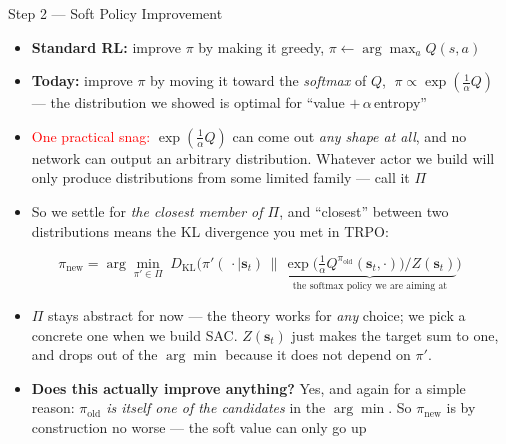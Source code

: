 \begin{frame}{Step 2 --- Soft Policy Improvement}
\small
\begin{itemize}
    \item \textbf{Standard RL:} improve $\pi$ by making it greedy, $\pi \leftarrow \arg\max_a Q(s,a)$
    \item \textbf{Today:} improve $\pi$ by moving it toward the \emph{softmax} of $Q$, $\;\pi \propto \exp(\tfrac1\alpha Q)$ --- the distribution we showed is optimal for ``value $+\,\alpha\,$entropy''
    \vspace{0.4em}
    \item \textcolor{red}{One practical snag:} $\exp(\tfrac1\alpha Q)$ can come out \emph{any shape at all}, and no network can output an arbitrary distribution. Whatever actor we build will only produce distributions from some limited family --- call it $\Pi$
    \item So we settle for \emph{the closest member of $\Pi$}, and ``closest'' between two distributions means the KL divergence you met in TRPO:
\end{itemize}
\[
\pi_{\text{new}} = \arg\min_{\pi' \in \Pi} \; D_{\mathrm{KL}}\!\Big( \pi'(\,\cdot \mid \mathbf{s}_t) \,\Big\|\, \underbrace{\exp\!\big( \tfrac{1}{\alpha} Q^{\pi_{\text{old}}}(\mathbf{s}_t, \cdot)\big) \big/ Z(\mathbf{s}_t)}_{\text{the softmax policy we are aiming at}} \Big)
\]
\vspace{-0.3em}
\begin{itemize}
    \item[] {\footnotesize $\Pi$ stays abstract for now --- the theory works for \emph{any} choice; we pick a concrete one when we build SAC. $Z(\mathbf{s}_t)$ just makes the target sum to one, and drops out of the $\arg\min$ because it does not depend on $\pi'$.}
    \vspace{0.4em}
    \item \textbf{Does this actually improve anything?} Yes, and again for a simple reason: \emph{$\pi_{\text{old}}$ is itself one of the candidates} in the $\arg\min$. So $\pi_{\text{new}}$ is by construction no worse --- the soft value can only go up
\end{itemize}
\end{frame}

